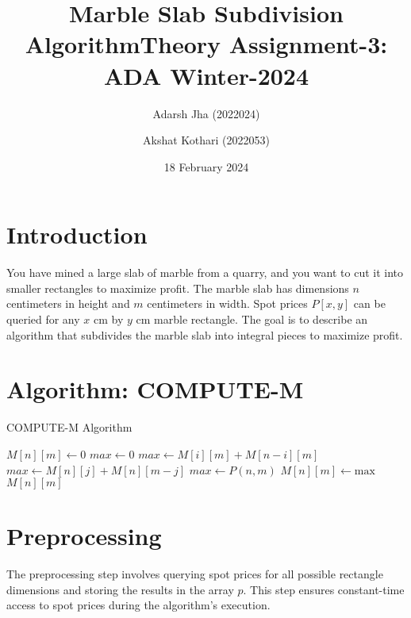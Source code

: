 \documentclass{article}
\title{Marble Slab Subdivision Algorithm}
\title{Theory Assignment-3: ADA Winter-2024}
\author{Adarsh Jha (2022024) \and Akshat Kothari (2022053)}
\date{18 February 2024}
\begin{document}
\maketitle

\section{Introduction}
You have mined a large slab of marble from a quarry, and you want to cut it into smaller rectangles to maximize profit. The marble slab has dimensions $n$ centimeters in height and $m$ centimeters in width. Spot prices $P[x, y]$ can be queried for any $x$ cm by $y$ cm marble rectangle. The goal is to describe an algorithm that subdivides the marble slab into integral pieces to maximize profit.

\section{Algorithm: COMPUTE-M}
\begin{algorithm}
\caption{COMPUTE-M Algorithm}
\begin{algorithmic}[1]
        \State \Return {}
        \State $M[n][m] \gets 0$ 
    \Else
        \State $max \gets 0$
         
            \State {}
            \State {}
                \State $max \gets M[i][m] + M[n-i][m]$
            \EndIf
        \EndFor
         
            \State {}
            \State {}
                \State $max \gets M[n][j] + M[n][m-j]$
            \EndIf
        \EndFor
         
            \State $max \gets P(n,m)$
        \EndIf
        \State $M[n][m] \gets \text{max}$
    \EndIf
    \State \Return $M[n][m]$
\EndFunction
\end{algorithmic}
\end{algorithm}

\section{Preprocessing}
The preprocessing step involves querying spot prices for all possible rectangle dimensions and storing the results in the array $p$. This step ensures constant-time access to spot prices during the algorithm's execution.
\end{document}
